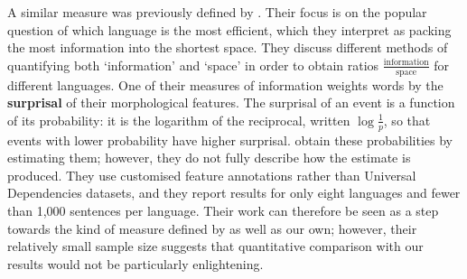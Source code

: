 \documentclass[USenglish]{article}
\begin{document}




A similar measure was previously defined by \citet{SPROAT14.47}.
Their focus is on the popular question of which language is the most efficient, which they interpret as packing the most information into the shortest space.
They discuss different methods of quantifying both `information' and `space' in order to obtain ratios $\frac{\text{information}}{\text{space}}$ for different languages.
One of their measures of information weights words by the \textbf{surprisal} of their morphological features.
The surprisal of an event is a function of its probability: it is the logarithm of the reciprocal, written $\log{\frac{1}{p}}$, so that events with lower probability have higher surprisal.
\citet{SPROAT14.47} obtain these probabilities by estimating them; however, they do not fully describe how the estimate is produced.
They use customised feature annotations rather than Universal Dependencies datasets, and they report results for only eight languages and fewer than 1,000 sentences per language.
Their work can therefore be seen as a step towards the kind of measure defined by \citet{ccoltekin2023complexity} as well as our own; however, their relatively small sample size suggests that quantitative comparison with our results would not be particularly enlightening.
\end{document}
